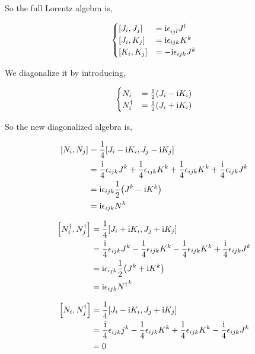 So the full Lorentz algebra is,

\begin{align}
    \begin{cases}
        \comm{J_i}{J_j}&=\im\tensor{\epsilon}{_i_j_l}J^l\\
        \comm{J_i}{K_j}&=\im\epsilon_{ijk}K^k\\
        \comm{K_i}{K_j}&=-\im\epsilon_{ijk}J^{k}
    \end{cases}\nonumber
\end{align}

We diagonalize it by introducing,

\begin{align}
    \begin{cases}
        N_i&=\frac12\qty(J_i-\textnormal{i} K_i)\\
        N^\dagger_i&=\frac12\qty(J_i+\textnormal{i} K_i)
    \end{cases}\nonumber
\end{align}

So the new diagonalized algebra is,

\begin{align}
    \comm{N_i}{N_j}&=\frac14\comm{J_i-\im K_i}{J_j-\im K_j}\nonumber\\
    &=\frac\im4\epsilon_{ijk}J^k+\frac14\epsilon_{ijk}K^k+\frac14\epsilon_{ijk}K^k+\frac\im4\epsilon_{ijk}J^k\nonumber\\
    &=\im\epsilon_{ijk}\frac12\qty(J^k-\im K^k)\nonumber\\
    &=\im\epsilon_{ijk}N^k\nonumber
\end{align}

\begin{align}
    \comm{N^\dagger_i}{N^\dagger_j}&=\frac14\comm{J_i+\im K_i}{J_j+\im K_j}\nonumber\\
    &=\frac\im4\epsilon_{ijk}J^k-\frac14\epsilon_{ijk}K^k-\frac14\epsilon_{ijk}K^k+\frac\im4\epsilon_{ijk}J^k\nonumber\\
    &=\im\epsilon_{ijk}\frac12\qty(J^k+\im K^k)\nonumber\\
    &=\im\epsilon_{ijk}{N^\dagger}^k\nonumber
\end{align}

\begin{align}
    \comm{N_i}{N^\dagger_j}&=\frac14\comm{J_i-\im K_i}{J_j+\im K_j}\nonumber\\
    &=\frac\im4\epsilon_{ijk}j^k-\frac14\epsilon_{ijk}K^k+\frac14\epsilon_{ijk}K^k-\frac\im4\epsilon_{ijk}J^k\nonumber\\
    &=0\nonumber
\end{align}

